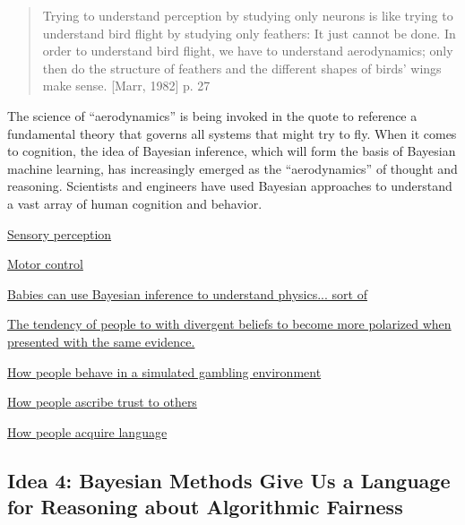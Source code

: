 \documentclass[assignment01_Solutions]{subfiles}
\begin{document}
\begin{quote}
Trying to understand perception by studying only neurons is like trying to understand bird flight by studying only feathers: It just cannot be done. In order to understand bird flight, we have to understand aerodynamics; only then do the structure of feathers and the different shapes of birds' wings make sense. [Marr, 1982] p. 27
 \end{quote}

The science of ``aerodynamics'' is being invoked in the quote to reference a fundamental theory that governs all systems that might try to fly.  When it comes to cognition, the idea of Bayesian inference, which will form the basis of Bayesian machine learning, has increasingly emerged as the ``aerodynamics'' of thought and reasoning.  Scientists and engineers have used Bayesian approaches to understand a vast array of human cognition and behavior.

\bi
\item \href{https://www.sciencedirect.com/science/article/pii/S0022249615000061}{Sensory perception}
\item \href{https://www.nature.com/articles/nn963}{Motor control}
\item \href{https://pubmed.ncbi.nlm.nih.gov/21617069/}{Babies can use Bayesian inference to understand physics... sort of}
\item \href{https://www.ncbi.nlm.nih.gov/pubmed/24730598}{The tendency of people to with divergent beliefs to become more polarized when presented with the same evidence.}
\item \href{https://www.sciencedirect.com/science/article/pii/S0022249608001090}{How people behave in a simulated gambling environment}
\item \href{https://arxiv.org/abs/1806.03916}{How people ascribe trust to others}
\item \href{https://www.sciencedirect.com/science/article/pii/S1364661306001318}{How people acquire language}
\ei


\subsection*{Idea 4: Bayesian Methods Give Us a Language for Reasoning about Algorithmic Fairness}
\end{document}
